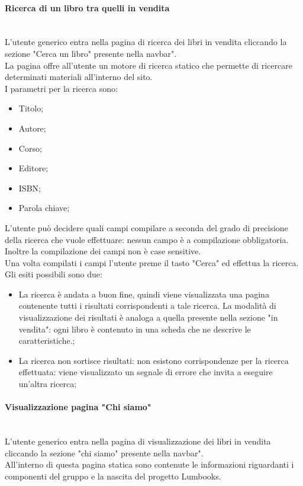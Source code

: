 \paragraph{Ricerca di un libro tra quelli in vendita}\mbox{}\\
\label{par:RicercaLibro}
L'utente generico entra nella pagina di ricerca dei libri in vendita cliccando la sezione "Cerca un libro" presente nella navbar".\\
La pagina offre all'utente un motore di ricerca statico che permette di ricercare determinati materiali all'interno del sito.\\
I parametri per la ricerca sono:
\begin{itemize}
	\item Titolo;
	\item Autore;
	\item Corso;
	\item Editore;
	\item ISBN;
	\item Parola chiave;
\end{itemize}
L'utente può decidere quali campi compilare a seconda del grado di precisione della ricerca che vuole effettuare: nessun campo è a compilazione obbligatoria. Inoltre la compilazione dei campi non è case sensitive.\\
Una volta compilati i campi l'utente preme il tasto "Cerca" ed effettua la ricerca. Gli esiti possibili sono due:
\begin{itemize}
	\item La ricerca è andata a buon fine, quindi viene visualizzata una pagina contenente tutti i risultati corrispondenti a tale ricerca. La modalità di visualizzazione dei risultati è analoga a quella presente nella sezione "in vendita": ogni libro è contenuto in una scheda che ne descrive le caratteristiche.;
	\item La ricerca non sortisce risultati: non esistono corrispondenze per la ricerca effettuata: viene visualizzato un segnale di errore che invita a eseguire un'altra ricerca;
	
\end{itemize}

\paragraph{Visualizzazione pagina "Chi siamo"}\mbox{}\\
\label{par:VisAbout}
L'utente generico entra nella pagina di visualizzazione dei libri in vendita cliccando la sezione "chi siamo" presente nella navbar".\\
All'interno di questa pagina statica sono contenute le informazioni riguardanti i componenti del gruppo e la nascita del progetto Lumbooks.

